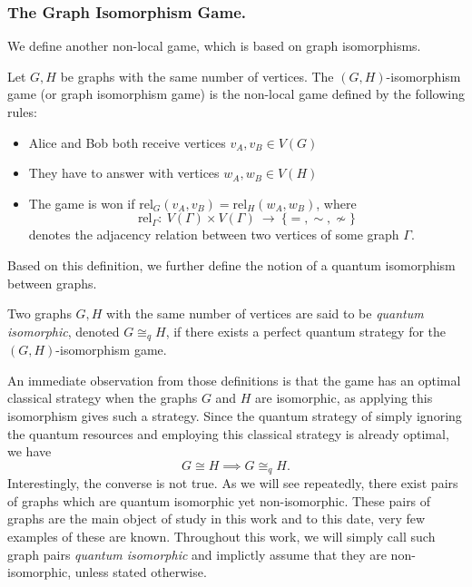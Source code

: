 \subsubsection{The Graph Isomorphism Game.}

We define another non-local game, which is based on graph isomorphisms.
\begin{definition}
    Let $G, H$ be graphs with the same number of vertices.
    The $(G, H)$-isomorphism game (or graph isomorphism game)
    is the non-local game defined by the following rules:
    \begin{itemize}
        \item Alice and Bob both receive vertices $v_A, v_B \in V(G)$
        \item They have to answer with vertices $w_A, w_B \in V(H)$
        \item The game is won if $\textrm{rel}_G(v_A, v_B) = \textrm{rel}_H(w_A, w_B)$,
        where 
        \[ \textrm{rel}_\Gamma:~V(\Gamma) \times V(\Gamma)~\rightarrow~\{ =, \sim, \not \sim \} \]
        denotes the adjacency relation between two vertices of some graph $\Gamma$.
    \end{itemize}
\end{definition}
Based on this definition, we further define the notion of a quantum isomorphism between graphs.
\begin{definition}
    Two graphs $G, H$ with the same number of vertices are said to be \emph{quantum isomorphic},
    denoted $G \cong_q H$, if there exists a perfect quantum
    strategy for the $(G, H)$-isomorphism game.
\end{definition}
\begin{remark}
    An immediate observation from those definitions is that the game 
    has an optimal classical strategy when the graphs $G$ and $H$ are isomorphic,
    as applying this isomorphism gives such a strategy.
    Since the quantum strategy of simply ignoring the quantum resources and employing
    this classical strategy is already optimal, we have
    \[ G \cong H \implies G \cong_q H. \]
    Interestingly, the converse is not true.
    As we will see repeatedly, there exist pairs of graphs 
    which are quantum isomorphic yet non-isomorphic.
    These pairs of graphs are the main object of study in this work 
    and to this date, very few examples of these are known.
    Throughout this work, we will simply call such graph pairs 
    \emph{quantum isomorphic} and implictly assume
    that they are non-isomorphic, unless stated otherwise.
\end{remark}
